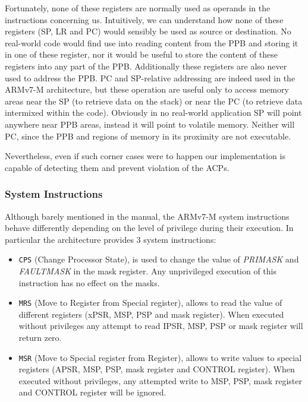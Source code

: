 \documentclass{article}
\begin{document}
Fortunately, none of these registers are normally used as operands in the instructions concerning us. Intuitively, we can understand how none of these registers (SP, LR and PC) would sensibly be used as source or destination. No real-world code would find use into reading content from the PPB and storing it in one of these register, nor it would be useful to store the content of these registers into any part of the PPB. Additionally these registers are also never used to address the PPB. PC and SP-relative addressing are indeed used in the ARMv7-M architecture, but these operation are useful only to access memory areas near the SP (to retrieve data on the stack) or near the PC (to retrieve data intermixed within the code). Obviously in no real-world application SP will point anywhere near PPB areas, instead it will point to volatile memory. Neither will PC, since the PPB and regions of memory in its proximity are not executable.

Nevertheless, even if such corner cases were to happen our implementation is capable of detecting them and prevent violation of the ACPs.

\subsubsection{System Instructions}
\label{subsubsec:system_instructions}
Although barely mentioned in the manual, the ARMv7-M system instructions behave differently depending on the level of privilege during their execution. In particular the architecture provides 3 system instructions:
\begin{itemize}
	\item \verb|CPS| (Change Processor State), is used to change the value of \textit{PRIMASK} and \textit{FAULTMASK} in the mask register. Any unprivileged execution of this instruction has no effect on the masks.
	\item \verb|MRS| (Move to Register from Special register), allows to read the value of different registers (xPSR, MSP, PSP and mask register). When executed without privileges any attempt to read IPSR, MSP, PSP or mask register will return zero.
	\item \verb|MSR| (Move to Special register from Register), allows to write values to special registers (APSR, MSP, PSP, mask register and CONTROL register). When executed without privileges, any attempted write to MSP, PSP, mask register and CONTROL register will be ignored.
\end{itemize}
\end{document}
